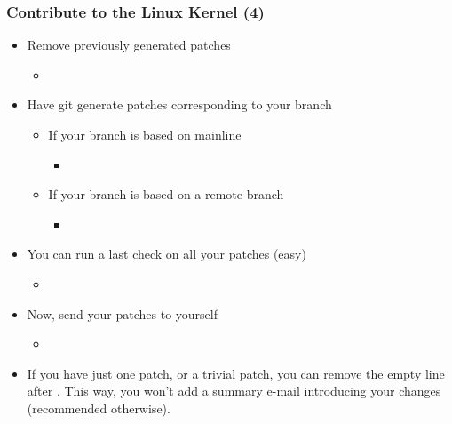 \begin{frame}
  \frametitle{Contribute to the Linux Kernel (4)}
  \begin{itemize}
  \item Remove previously generated patches
    \begin{itemize}
    \item {}
    \end{itemize}
  \item Have git generate patches corresponding to your branch
    \begin{itemize}
    \item If your branch is based on mainline
      \begin{itemize}
      \item {}
      \end{itemize}
    \item If your branch is based on a remote branch
      \begin{itemize}
      \item {}
      \end{itemize}
    \end{itemize}
  \item You can run a last check on all your patches (easy)
    \begin{itemize}
    \item {}
    \end{itemize}
  \item Now, send your patches to yourself
    \begin{itemize}
    \item {}
    \end{itemize}
  \item If you have just one patch, or a trivial patch, you can remove
    the empty line after . This way, you won't add
    a summary e-mail introducing your changes (recommended otherwise).
  \end{itemize}
\end{frame}

